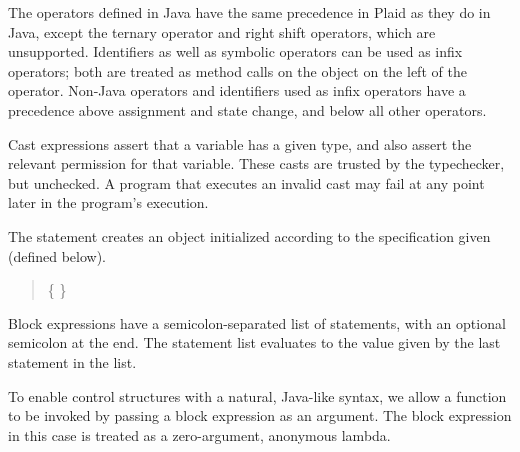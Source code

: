 The operators defined in Java have the same precedence in Plaid as
they do in Java, except the ternary operator and right shift operators, 
which are unsupported.  Identifiers as well as symbolic operators can be
used as infix operators; both are treated as method calls on the
object on the left of the operator.  Non-Java operators and
identifiers used as infix operators have a precedence above assignment
and state change, and below all other operators.

Cast expressions assert that a variable has a given type, and
also assert the relevant permission for that variable.  These casts
are trusted by the typechecker, but unchecked. A program that executes 
an invalid cast may fail at any point later in the program's 
execution.

\begin{quote}


 {}

 {} 

 {}

\end{quote}

The  statement creates an object initialized according to the
 specification given (defined below).

\begin{quote}


 \{  \}


 {}  \opt{;}

\end{quote}

Block expressions have a semicolon-separated list of statements, with
an optional semicolon at the end.  The statement list evaluates to the
value given by the last statement in the list.

\begin{quote}


 {}

 {} 

\end{quote}

To enable control structures with a natural, Java-like syntax, we allow
a function to be invoked by passing a block expression as an argument.  The
block expression in this case is treated as a zero-argument, anonymous lambda.

